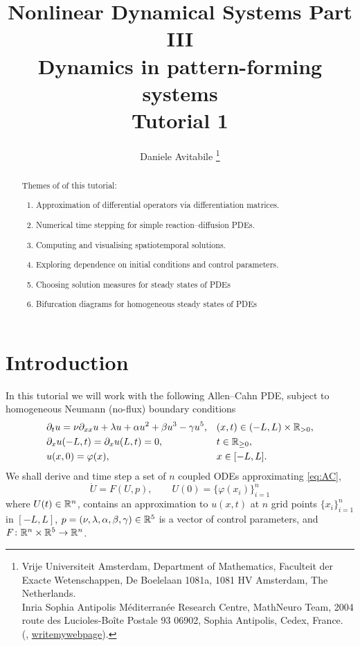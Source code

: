 \documentclass[a4paper]{siamart220329}
\title{Nonlinear Dynamical Systems Part III \\ 
  Dynamics in pattern-forming systems \\
  Tutorial 1
}
\author{%
  Daniele Avitabile%
  \thanks{%
    Vrije Universiteit Amsterdam,
    Department of Mathematics,
    Faculteit der Exacte Wetenschappen,
    De Boelelaan 1081a,
    1081 HV Amsterdam, The Netherlands.
  \protect\\
    Inria Sophia Antipolis M\'editerran\'ee Research Centre,
    MathNeuro Team,
    2004 route des Lucioles-Boîte Postale 93 06902,
    Sophia Antipolis, Cedex, France.
  \protect\\
    (\email{d.avitabile@vu.nl}, \url{writemywebpage}).
  }
}
\theoremstyle{plain}
\begin{document}
\maketitle

\begin{abstract}
  Themes of of this tutorial:
  \begin{enumerate}
    \item Approximation of differential operators via differentiation matrices.
    \item Numerical time stepping for simple reaction--diffusion PDEs.
    \item Computing and visualising spatiotemporal solutions.
    \item Exploring dependence on initial conditions and control parameters.
    \item Choosing solution measures for steady states of PDEs
    \item Bifurcation diagrams for homogeneous steady states of PDEs
  \end{enumerate}
\end{abstract}

\section{Introduction}
In this tutorial we will work with the following Allen--Cahn PDE, subject to
homogeneous Neumann (no-flux) boundary conditions
\begin{equation}\label{eq:AC}
  \begin{aligned}
    & \partial_t u = \nu \partial_{xx}u + \lambda u + \alpha u^2 + \beta u^3 - \gamma
    u^5, & & (x,t) \in (-L,L) \times \RSet_{>0}, \\
	& \partial_x u(-L,t) = \partial_x u(L,t) = 0, && t \in \RSet_{\geq 0}, \\
	& u(x,0) = \varphi(x), && x \in [-L,L].
  \end{aligned}
\end{equation}
We shall derive and time step a set of $n$ coupled ODEs approximating \cref{eq:AC}, %
\begin{equation}
  \dot U = F(U,p), \qquad U(0) = \{ \varphi(x_i) \}_{i=1}^n
\end{equation}
where $U(t) \in \mathbb{R}^n$, contains an approximation to $u(x,t)$ at $n$ grid points 
$\{ x_i \}_{i=1}^n$ in $[-L,L]$, $p = (\nu,\lambda,\alpha,\beta,\gamma) \in \mathbb{R}^5$ is a
vector of control parameters, and $F \colon \mathbb{R}^n \times \mathbb{R}^5 \to
\mathbb{R}^n$. 
\end{document}
